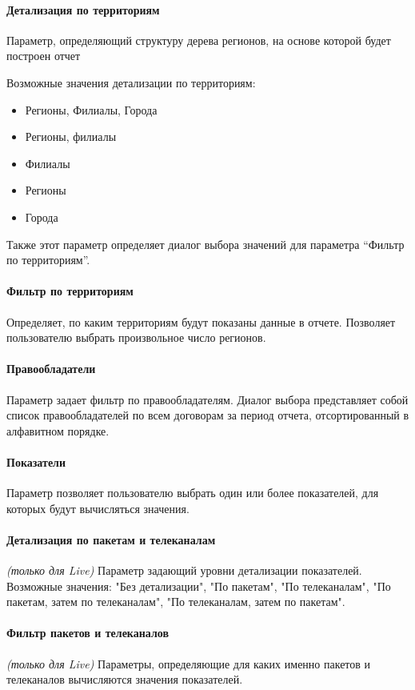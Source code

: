 \paragraph{Детализация по территориям} Параметр, определяющий структуру дерева регионов, на основе
которой будет построен отчет

Возможные значения детализации по территориям:
\begin{itemize}
\item{
Регионы, Филиалы, Города
}
\item{
Регионы, филиалы
}
\item{
Филиалы
}
\item{
Регионы
}
\item{
Города
}
\end{itemize}

Также этот параметр определяет диалог выбора значений для параметра “Фильтр по территориям”.

\paragraph{Фильтр по территориям} Определяет, по каким территориям будут показаны данные в отчете. 
Позволяет пользователю выбрать произвольное число регионов.

\paragraph{Правообладатели} Параметр задает фильтр по правообладателям. 
Диалог выбора представляет собой список правообладателей по всем договорам за период отчета, отсортированный в алфавитном порядке.

\paragraph{Показатели} Параметр позволяет пользователю выбрать один или более показателей, для которых будут вычисляться значения.

\paragraph{Детализация по пакетам и телеканалам} \textit{(только для Live)}
Параметр задающий уровни детализации показателей. Возможные значения:
"Без детализации", "По пакетам", "По телеканалам", "По пакетам, затем по телеканалам",
"По телеканалам, затем по пакетам".

\paragraph{Фильтр пакетов и телеканалов} \textit{(только для Live)} Параметры, определяющие для каких именно пакетов
и телеканалов вычисляются значения показателей.

